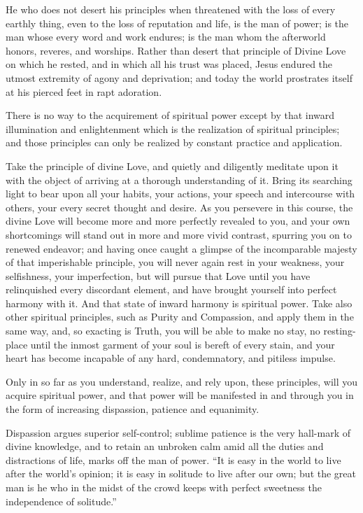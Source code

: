 \documentclass[12pt,oneside]{scrbook}
\begin{document}
  He who does not desert his principles when threatened with the loss of
  every earthly thing, even to the loss of reputation and life, is the man
  of power; is the man whose every word and work endures; is the man whom
  the afterworld honors, reveres, and worships. Rather than desert that
  principle of Divine Love on which he rested, and in which all his trust
  was placed, Jesus endured the utmost extremity of agony and deprivation;
  and today the world prostrates itself at his pierced feet in rapt
  adoration.
  
  There is no way to the acquirement of spiritual power except by that
  inward illumination and enlightenment which is the realization of
  spiritual principles; and those principles can only be realized by
  constant practice and application.
  
  Take the principle of divine Love, and quietly and diligently meditate
  upon it with the object of arriving at a thorough understanding of it.
  Bring its searching light to bear upon all your habits, your actions,
  your speech and intercourse with others, your every secret thought and
  desire. As you persevere in this course, the divine Love will become
  more and more perfectly revealed to you, and your own shortcomings will
  stand out in more and more vivid contrast, spurring you on to renewed
  endeavor; and having once caught a glimpse of the incomparable majesty
  of that imperishable principle, you will never again rest in your
  weakness, your selfishness, your imperfection, but will pursue that Love
  until you have relinquished every discordant element, and have brought
  yourself into perfect harmony with it. And that state of inward harmony
  is spiritual power. Take also other spiritual principles, such as Purity
  and Compassion, and apply them in the same way, and, so exacting is
  Truth, you will be able to make no stay, no resting-place until the
  inmost garment of your soul is bereft of every stain, and your heart has
  become incapable of any hard, condemnatory, and pitiless impulse.
  
  Only in so far as you understand, realize, and rely upon, these
  principles, will you acquire spiritual power, and that power will be
  manifested in and through you in the form of increasing dispassion,
  patience and equanimity.
  
  Dispassion argues superior self-control; sublime patience is the very
  hall-mark of divine knowledge, and to retain an unbroken calm amid all
  the duties and distractions of life, marks off the man of power. ``It is
  easy in the world to live after the world's opinion; it is easy in
  solitude to live after our own; but the great man is he who in the midst
  of the crowd keeps with perfect sweetness the independence of
  solitude.''
  
\end{document}

